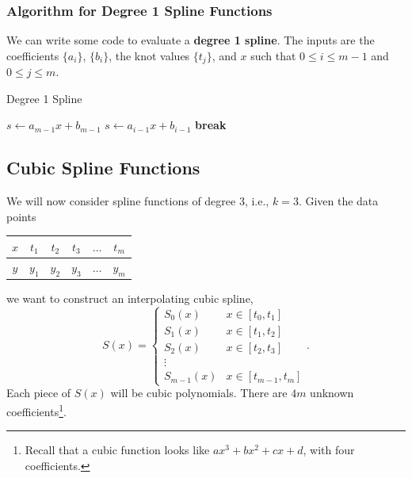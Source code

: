 \documentclass[letterpaper]{article}
\begin{document}
\subsubsection{Algorithm for Degree 1 Spline Functions}
We can write some code to evaluate a \textbf{degree 1 spline}. The inputs are the coefficients $\{a_i\}$, $\{b_i\}$, the knot values $\{t_j\}$, and $x$ such that $0 \leq i \leq m - 1$ and $0 \leq j \leq m$. 
\begin{algorithm}[H]
    \caption{Degree 1 Spline}
    \label{alg:one}
    \begin{algorithmic}[1]
            \State $s \gets a_{m - 1} x + b_{m - 1}$
                    \State $s \gets a_{i - 1} x + b_{i - 1}$ 
                    \State \textbf{break}
                \EndIf 
            \EndFor 
        \EndFunction
    \end{algorithmic}
\end{algorithm}

\subsection{Cubic Spline Functions}
We will now consider spline functions of degree 3, i.e., $k = 3$. Given the data points 
\begin{center}
    \begin{tabular}{c|c c c c c}
        $x$ & $t_1$ & $t_2$ & $t_3$ & $\hdots$ & $t_m$ \\
        \hline  
        $y$ & $y_1$ & $y_2$ & $y_3$ & $\hdots$ & $y_m$
    \end{tabular}
\end{center}
we want to construct an interpolating cubic spline,
\[S(x) = \begin{cases}
    S_{0}(x) & x \in [t_0, t_1] \\ 
    S_{1}(x) & x \in [t_1, t_2] \\ 
    S_{2}(x) & x \in [t_2, t_3] \\ 
    \vdots \\ 
    S_{m - 1}(x) & x \in [t_{m - 1}, t_m]
\end{cases}.\]
Each piece of $S(x)$ will be cubic polynomials. There are $4m$ unknown coefficients\footnote{Recall that a cubic function looks like $ax^3 + bx^2 + cx + d$, with four coefficients.}. 
\end{document}
